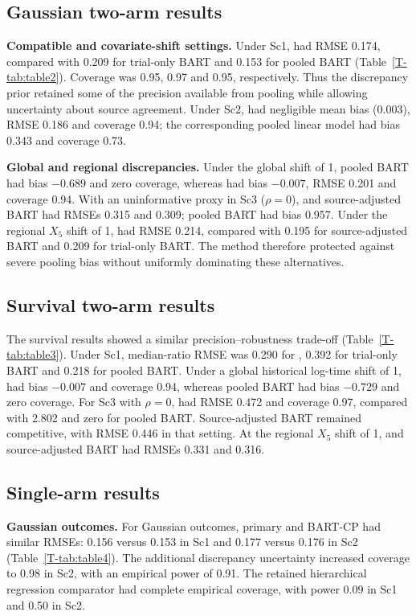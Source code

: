 \documentclass[11pt]{article}
\begin{document}
\subsection{Gaussian two-arm results}
\noindent\textbf{Compatible and covariate-shift settings.}
Under Sc1, \lrc{} had RMSE 0.174, compared with 0.209 for trial-only BART and 0.153 for pooled BART (Table~\ref{T-tab:table2}). Coverage was 0.95, 0.97 and 0.95, respectively. Thus the discrepancy prior retained some of the precision available from pooling while allowing uncertainty about source agreement. Under Sc2, \lrc{} had negligible mean bias (0.003), RMSE 0.186 and coverage 0.94; the corresponding pooled linear model had bias 0.343 and coverage 0.73.

\noindent\textbf{Global and regional discrepancies.}
Under the global shift of 1, pooled BART had bias $-0.689$ and zero coverage, whereas \lrc{} had bias $-0.007$, RMSE 0.201 and coverage 0.94. With an uninformative proxy in Sc3 ($\rho=0$), \lrc{} and source-adjusted BART had RMSEs 0.315 and 0.309; pooled BART had bias 0.957. Under the regional $X_5$ shift of 1, \lrc{} had RMSE 0.214, compared with 0.195 for source-adjusted BART and 0.209 for trial-only BART. The method therefore protected against severe pooling bias without uniformly dominating these alternatives.

\subsection{Survival two-arm results}
The survival results showed a similar precision--robustness trade-off (Table~\ref{T-tab:table3}). Under Sc1, median-ratio RMSE was 0.290 for \lrc{}, 0.392 for trial-only BART and 0.218 for pooled BART. Under a global historical log-time shift of 1, \lrc{} had bias $-0.007$ and coverage 0.94, whereas pooled BART had bias $-0.729$ and zero coverage. For Sc3 with $\rho=0$, \lrc{} had RMSE 0.472 and coverage 0.97, compared with 2.802 and zero for pooled BART. Source-adjusted BART remained competitive, with RMSE 0.446 in that setting. At the regional $X_5$ shift of 1, \lrc{} and source-adjusted BART had RMSEs 0.331 and 0.316.

\subsection{Single-arm results}
\noindent\textbf{Gaussian outcomes.}
For Gaussian outcomes, primary \lrc{} and BART-CP had similar RMSEs: 0.156 versus 0.153 in Sc1 and 0.177 versus 0.176 in Sc2 (Table~\ref{T-tab:table4}). The additional discrepancy uncertainty increased coverage to 0.98 in Sc2, with an empirical power of 0.91. The retained hierarchical regression comparator had complete empirical coverage, with power 0.09 in Sc1 and 0.50 in Sc2.
\end{document}
